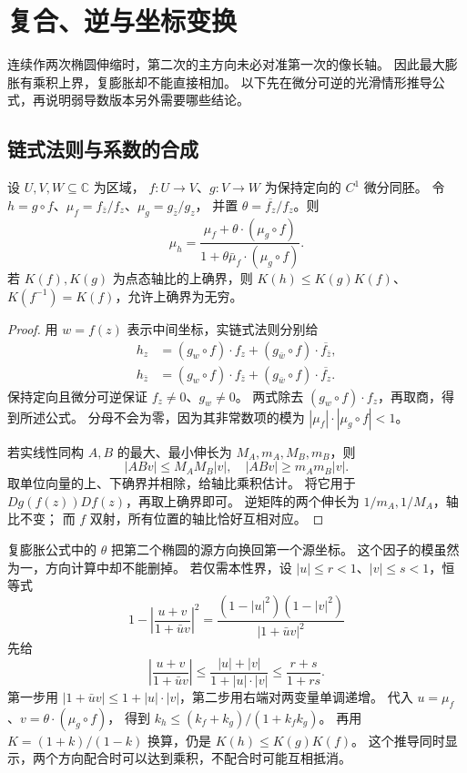 \section{复合、逆与坐标变换}
\label{b3:sec:B02}

连续作两次椭圆伸缩时，第二次的主方向未必对准第一次的像长轴。
因此最大膨胀有乘积上界，复膨胀却不能直接相加。
以下先在微分可逆的光滑情形推导公式，再说明弱导数版本另外需要哪些结论。

\subsection{链式法则与系数的合成}
\label{b3:subsec:B0201}

\begin{proposition}[光滑复合公式]\label{b3:prop:B-composition}
设 \(U,V,W\subseteq\mathbb C\) 为区域，
\(f:U\rightarrow V\)、\(g:V\rightarrow W\) 为保持定向的 \(C^1\) 微分同胚。
令 \(h=g\circ f\)、\(\mu_f=f_{\bar z}/f_z\)、\(\mu_g=g_{\bar z}/g_z\)，
并置 \(\theta=\overline{f_z}/f_z\)。则
\[
 \mu_h=
 \frac{\mu_f+\theta\cdot(\mu_g\circ f)}
      {1+\theta\bar\mu_f\cdot(\mu_g\circ f)}.
\]
若 \(K(f),K(g)\) 为点态轴比的上确界，则
\(K(h)\le K(g)K(f)\)、\(K(f^{-1})=K(f)\)，允许上确界为无穷。
\end{proposition}
\begin{proof}
用 \(w=f(z)\) 表示中间坐标，实链式法则分别给
\[
 \begin{aligned}
 h_z&=(g_w\circ f)\cdot f_z+(g_{\bar w}\circ f)\cdot\overline{f_{\bar z}},\\
 h_{\bar z}&=(g_w\circ f)\cdot f_{\bar z}
                 +(g_{\bar w}\circ f)\cdot\overline{f_z}.
 \end{aligned}
\]
保持定向且微分可逆保证 \(f_z\ne0\)、\(g_w\ne0\)。
两式除去 \((g_w\circ f)\cdot f_z\)，再取商，得到所述公式。
分母不会为零，因为其非常数项的模为
\(|\mu_f|\cdot|\mu_g\circ f|<1\)。

若实线性同构 \(A,B\) 的最大、最小伸长为 \(M_A,m_A,M_B,m_B\)，则
\[
 |ABv|\le M_A M_B|v|,\quad |ABv|\ge m_A m_B|v|.
\]
取单位向量的上、下确界并相除，给轴比乘积估计。
将它用于 \(Dg(f(z))Df(z)\)，再取上确界即可。
逆矩阵的两个伸长为 \(1/m_A,1/M_A\)，轴比不变；
而 \(f\) 双射，所有位置的轴比恰好互相对应。
\end{proof}
复膨胀公式中的 \(\theta\) 把第二个椭圆的源方向换回第一个源坐标。
这个因子的模虽然为一，方向计算中却不能删掉。
若仅需本性界，设 \(|u|\le r<1\)、\(|v|\le s<1\)，恒等式
\[
 1-\left|\frac{u+v}{1+\bar u v}\right|^2
 =\frac{(1-|u|^2)(1-|v|^2)}{|1+\bar u v|^2}
\]
先给
\[
 \left|\frac{u+v}{1+\bar u v}\right|
 \le\frac{|u|+|v|}{1+|u|\cdot|v|}
 \le\frac{r+s}{1+rs}.
\]
第一步用 \(|1+\bar u v|\le1+|u|\cdot|v|\)，第二步用右端对两变量单调递增。
代入 \(u=\mu_f\)、\(v=\theta\cdot(\mu_g\circ f)\)，
得到 \(k_h\le(k_f+k_g)/(1+k_fk_g)\)。
再用 \(K=(1+k)/(1-k)\) 换算，仍是 \(K(h)\le K(g)K(f)\)。
这个推导同时显示，两个方向配合时可以达到乘积，不配合时可能互相抵消。


